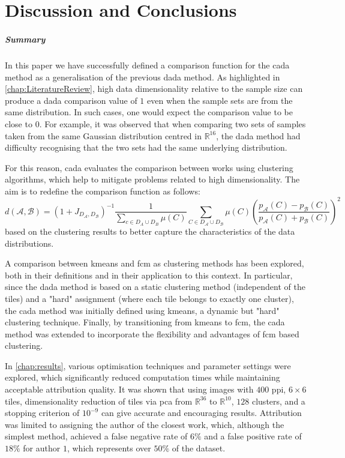 \chapter{Discussion and Conclusions}
\begin{toReview}
\paragraph{Summary}
In this paper we have successfully defined a comparison function for the \gls{cada} method as a generalisation of the previous \gls{dada} method. As highlighted in \cref{chap:LiteratureReview}, high data dimensionality relative to the sample size can produce a \gls{dada} comparison value of $1$ even when the sample sets are from the same distribution. In such cases, one would expect the comparison value to be close to $0$. For example, it was observed that when comparing two sets of samples taken from the same Gaussian distribution centred in $\mathbb{R}^{16}$, the \gls{dada} method had difficulty recognising that the two sets had the same underlying distribution.

\noindent For this reason, \gls{cada} evaluates the comparison between works using clustering algorithms, which help to mitigate problems related to high dimensionality. The aim is to redefine the comparison function as follows:
\[
	d\left(\mathcal{A}, \mathcal{B}\right) = \left(1+J_{D_\mathcal{A}, D_\mathcal{B}}\right)^{-1}\frac{1}{\sum_{c\in D_A\cup D_B}\mu(C)}\sum_{C\in D_\mathcal{A}\cup D_\mathcal{B}}\mu(C)\left(\frac{p_\mathcal{A}(C) - p_\mathcal{B}(C)}{p_\mathcal{A}(C) + p_\mathcal{B}(C)}\right)^2
\]
based on the clustering results to better capture the characteristics of the data distributions.

\noindent A comparison between \gls{kmeans} and \gls{fcm} as clustering methods has been explored, both in their definitions and in their application to this context. In particular, since the \gls{dada} method is based on a static clustering method (independent of the tiles) and a "hard" assignment (where each tile belongs to exactly one cluster), the \gls{cada} method was initially defined using \gls{kmeans}, a dynamic but "hard" clustering technique. Finally, by transitioning from \gls{kmeans} to \gls{fcm}, the \gls{cada} method was extended to incorporate the flexibility and advantages of \gls{fcm} based clustering.

\noindent In \cref{chap:results}, various optimisation techniques and parameter settings were explored, which significantly reduced computation times while maintaining acceptable attribution quality. It was shown that using images with $400$ \gls{ppi}, $6\times6$ tiles, dimensionality reduction of tiles via \gls{pca} from $\mathbb{R}^{36}$ to $\mathbb{R}^{10}$, $128$ clusters, and a stopping criterion of $10^{-9}$ can give accurate and encouraging results. Attribution was limited to assigning the author of the closest work, which, although the simplest method, achieved a false negative rate of $6\%$ and a false positive rate of $18\%$ for author $1$, which represents over $50\%$ of the dataset.


\end{toReview}
